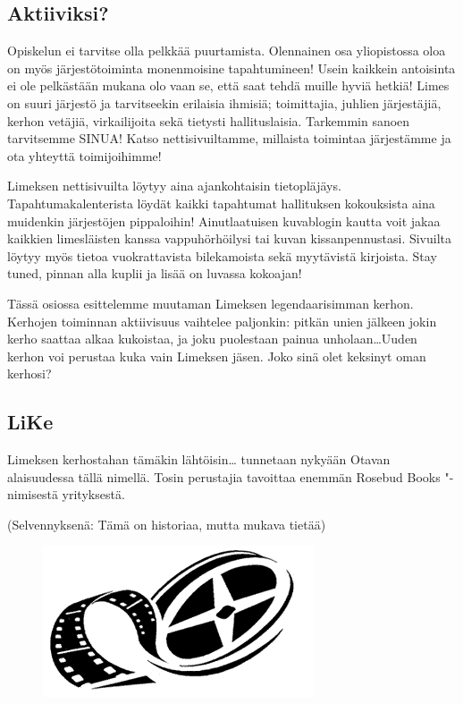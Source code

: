 \documentclass[a5paper, 8pt, twocolumn]{book} %
\numberwithin{equation}{section}
\begin{document}
\subsection*{Aktiiviksi?}
Opiskelun ei tarvitse olla pelkkää puurtamista.
Olennainen osa yliopistossa oloa
on myös järjestötoiminta monenmoisine
tapahtumineen! Usein kaikkein antoisinta
ei ole pelkästään mukana olo vaan se, että
saat tehdä muille hyviä hetkiä! Limes on
suuri järjestö ja tarvitseekin erilaisia ihmisiä;
toimittajia, juhlien järjestäjiä, kerhon
vetäjiä, virkailijoita sekä tietysti hallituslaisia.
Tarkemmin sanoen tarvitsemme
\mbox{SINUA}! Katso nettisivuiltamme, millaista
toimintaa järjestämme ja ota yhteyttä toimijoihimme!

Limeksen nettisivuilta löytyy aina ajankohtaisin
tietopläjäys. Tapahtumakalenterista
löydät kaikki tapahtumat hallituksen
kokouksista aina muidenkin järjestöjen
pippaloihin! Ainutlaatuisen kuvablogin
kautta voit jakaa kaikkien limesläisten
kanssa vappuhörhöilysi tai kuvan kissanpennustasi.
Sivuilta löytyy myös tietoa
vuokrattavista bilekamoista sekä myytävistä
kirjoista. Stay tuned, pinnan alla
kuplii ja lisää on luvassa kokoajan!

Tässä osiossa esittelemme muutaman
Limeksen legendaarisimman kerhon. Kerhojen
toiminnan aktiivisuus vaihtelee paljonkin:
pitkän unien jälkeen jokin kerho
saattaa alkaa kukoistaa, ja joku puolestaan
painua unholaan\dots Uuden kerhon voi perustaa
kuka vain Limeksen jäsen. Joko sinä
olet keksinyt oman kerhosi?
\subsection*{LiKe}
Limeksen kerhostahan tämäkin lähtöisin\dots
tunnetaan nykyään Otavan alaisuudessa
tällä nimellä. Tosin perustajia tavoittaa
enemmän Rosebud Books "-nimisestä
yrityksestä.

(Selvennyksenä: Tämä on historiaa,
mutta mukava tietää)
\begin{figure}[h!]
	\centering
	\includegraphics[width=0.8\columnwidth]{lieke.png}
\end{figure}
\end{document}
